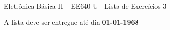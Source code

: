 \documentclass[addpoints]{exam}
\begin{document}
 
\begin{center}
Eletrônica Básica II – EE640 U - Lista de Exercícios 3
\end{center}
 
\vspace{5mm}
 
\hfill
{}

\begin{center}
A lista deve ser entregue até dia \textbf{01-01-1968}
\end{center}

\hspace{2mm}

\begin{center}
\gradetable[h][questions]
\end{center}

\hspace{2mm}
\end{document}
